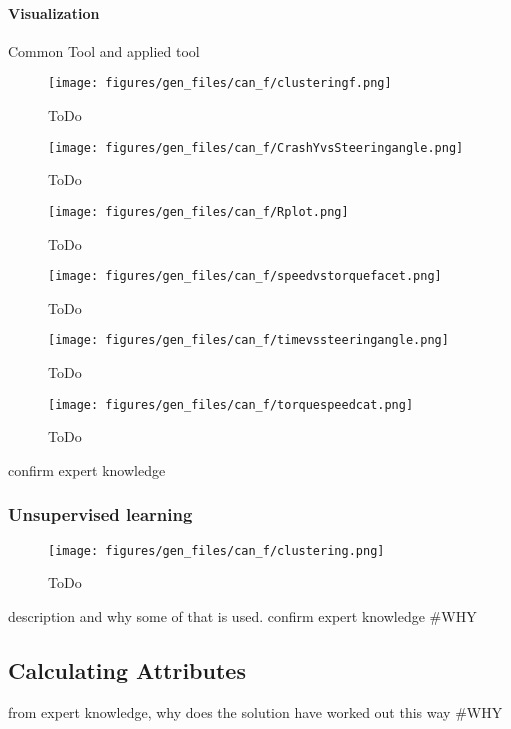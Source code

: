 		\paragraph{Visualization}
		Common Tool and applied tool
		\begin{figure}[!ht]
			\centering
			\texttt{[image: figures/gen\_files/can\_f/clusteringf.png]}
			\caption{ToDo} 
			\end{figure}
		\begin{figure}[!ht]
			\centering
			\texttt{[image: figures/gen\_files/can\_f/CrashYvsSteeringangle.png]}
			\caption{ToDo} 
			\end{figure}
		\begin{figure}[!ht]
			\centering
			\texttt{[image: figures/gen\_files/can\_f/Rplot.png]}
			\caption{ToDo} 
			\end{figure}		
		\begin{figure}[!ht]
			\centering
			\texttt{[image: figures/gen\_files/can\_f/speedvstorquefacet.png]}
			\caption{ToDo} 
			\end{figure}	
		\begin{figure}[!ht]
			\centering
			\texttt{[image: figures/gen\_files/can\_f/timevssteeringangle.png]}
			\caption{ToDo} 
			\end{figure}	
		\begin{figure}[!ht]
			\centering
			\texttt{[image: figures/gen\_files/can\_f/torquespeedcat.png]}
			\caption{ToDo} 
			\end{figure}		
		confirm expert knowledge
	\subsubsection{Unsupervised learning}
			\begin{figure}[!ht]
			\centering
			\texttt{[image: figures/gen\_files/can\_f/clustering.png]}
			\caption{ToDo} 
			\end{figure}
	description and why some of that is used.
	confirm expert knowledge
	\#WHY
\subsection{Calculating Attributes}
	from expert knowledge, why does the solution have worked out this way
	\#WHY

